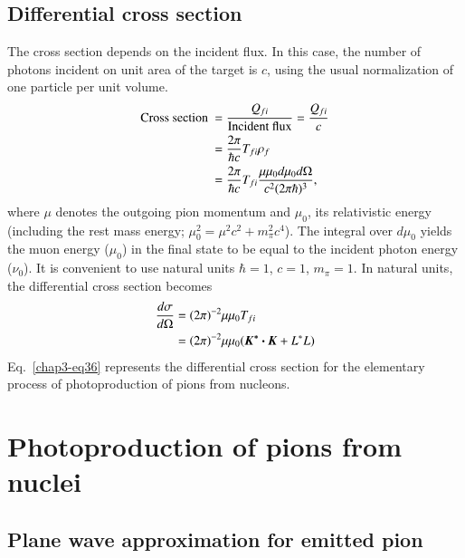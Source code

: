 \subsection{Differential cross section}\label{chap3-sec4.2}

The cross section depends on the incident flux. In this case, the number of photons incident on unit area of the target is $c$, using the usual normalization of one particle per unit volume.
\begin{align}
  \text{Cross section}~ & = \frac{Q_{fi}}{\text{Incident flux}} = \frac{Q_{fi}}{c}\notag \\
  & = \frac{2 \pi}{\hbar c} T_{fi} \rho_ f \notag \\
  & = \frac{2\pi}{\hbar c} T_{fi} \frac{\mu \mu_0 d \mu_0 d \Omega}{c^2 (2 \pi \hbar)^3},\label{chap3-eq35}
\end{align}
where $\mu$ denotes the outgoing pion momentum and $\mu_0$, its relativistic energy (including the rest mass energy; $\mu_0^2 = \mu^2 c^2 + m_\pi^2 c^4$). The integral over $d\mu_0$ yields the muon energy ($\mu_0$) in the final state to be equal to the incident photon energy ($\nu_0$). It is convenient to use natural units $\hbar =1$, $c=1$, $m_\pi =1$. In natural units, the differential cross section becomes
\begin{align}
  \frac{d \sigma}{d \Omega} & = (2 \pi)^{-2} \mu \mu_0 T_{fi}\notag \\
  & = (2 \pi)^{-2} \mu \mu_0 (\boldsymbol{K^\ast \cdot K} + L^\ast L) \label{chap3-eq36}
\end{align}
Eq.\ \eqref{chap3-eq36} represents the differential cross section for the elementary process of photoproduction of pions from nucleons.

\section{Photoproduction of pions from nuclei}\label{chap3-sec5}

\subsection{Plane wave approximation for emitted pion}\label{chap3-sec5.1}

